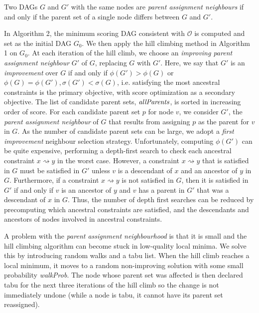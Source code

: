 \documentclass[twoside,11pt]{article}
\begin{document}
\begin{definition} 

Two DAGs $G$ and $G'$ with the same nodes
are \emph{parent assignment neighbours} if and only if the parent set of a single node differs between $G$ and $G'$.
\end{definition}

In Algorithm 2, the minimum scoring DAG consistent with $\mathcal{O}$ is computed and set as the initial DAG $G_0$. 
We then apply the hill climbing method in Algorithm 1 on $G_0$.
At each iteration of the hill climb, we choose an \emph{improving parent assignment neighbour} $G'$ of $G$, replacing $G$ with $G'$. 
Here, we say that $G'$ is an \emph{improvement} over $G$ if and only if $\phi(G') > \phi(G)$ or $\phi(G) = \phi(G'), \sigma(G') < \sigma(G)$,
i.e. satisfying the most ancestral constraints is the primary objective, 
with score optimization as a secondary objective. The list of candidate parent sets, $\emph{allParents}$, is sorted in increasing order of score. 
For each candidate parent set $p$ for node $v$, we consider $G'$, the \emph{parent assignment neighbour} of $G$ that results from assigning $p$ as the parent 
for $v$ in $G$. As the number of candidate parent sets can be large, we adopt a \emph{first improvement} neighbour selection strategy. 
Unfortunately, computing $\phi(G')$ can be quite expensive, performing a depth-first search to check each ancestral constraint $x \rightsquigarrow y$ in
the worst case. However, a constraint $x \rightsquigarrow y$ that is satisfied in $G$
must be satisfied in $G'$ unless $v$ is a descendant of $x$ and an ancestor of $y$ in $G$. Furthermore, if a constraint $x \rightsquigarrow y$ is not satisfied in $G$,
then it is satisfied in $G'$ if and only if $v$ is an ancestor of $y$ and $v$ has a parent in $G'$ that was a descendant of $x$ in $G$. Thus, the number of depth first searches can
be reduced by precomputing which ancestral constraints are satisfied, and the descendants and ancestors of nodes involved in ancestral constraints.

\smallskip
A problem with the \emph{parent assignment neighbourhood} is that it is small and the hill climbing algorithm can become stuck in low-quality 
local minima. We solve this by introducing random walks and a tabu list. When the hill climb reaches a local minimum, it moves 
to a random non-improving solution with some small probability \emph{walkProb}. The node whose parent set was affected is then declared tabu for the next three iterations of the hill climb
so the change is not immediately undone (while a node is tabu, it cannot have its parent set reassigned).
\end{document}
